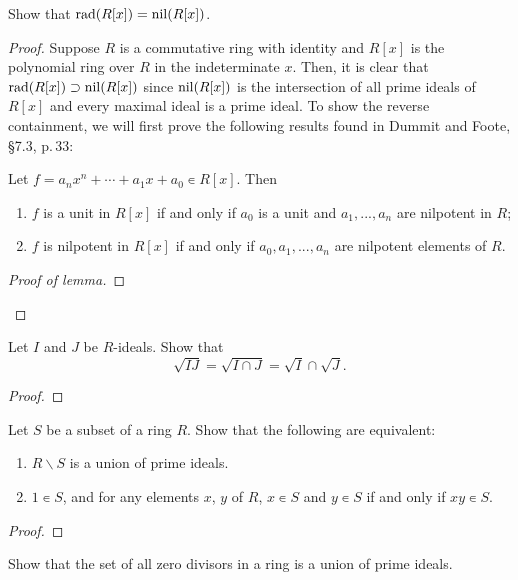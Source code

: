 \begin{problem}
Show that $\mathrm{rad}(R[x])=\mathrm{nil}(R[x])$.
\end{problem}
\begin{proof}
Suppose $R$ is a commutative ring with identity and $R[x]$ is the
polynomial ring over $R$ in the indeterminate $x$. Then, it is
clear that $\mathrm{rad}(R[x])\supset\mathrm{nil}(R[x])$ since $\mathrm{nil}(R[x])$ is
the intersection of all prime ideals of $R[x]$ and every maximal
ideal is a prime ideal. To show the reverse containment, we will
first prove the following results found in Dummit and Foote,
\S7.3, p.\,33:
\begin{lemma}
Let $f=a_nx^n+\cdots+a_1x+a_0\smallin R[x]$. Then
\begin{enumerate}[noitemsep,label=(\alph*)]
\item $f$ is a unit in $R[x]$ if and only if $a_0$ is a unit and
  $a_1,...,a_n$ are nilpotent in $R$;
\item $f$ is nilpotent in $R[x]$ if and only if $a_0,a_1,...,a_n$
  are nilpotent elements of $R$.
\end{enumerate}
\end{lemma}
\begin{proof}[Proof of lemma]
\renewcommand\qedsymbol{$\clubsuit$}
\end{proof}
\end{proof}
\newpage
\begin{problem}
Let $I$ and $J$ be $R$-ideals. Show that
\[\sqrt{IJ}=\sqrt{I\cap J}=\sqrt{I}\cap\sqrt{J}.\]
\end{problem}
\begin{proof}
\end{proof}
\newpage
\begin{problem}
Let $S$ be a subset of a ring $R$. Show that the following are
equivalent:
\begin{enumerate}[noitemsep,label=(\roman*)]
\item $R\smallsetminus S$ is a union of prime ideals.
\item $1\smallin S$, and for any elements $x$, $y$ of $R$, $x\smallin S$
  and $y\smallin S$ if and only if $xy\smallin S$.
\end{enumerate}
\end{problem}
\begin{proof}

\end{proof}
\newpage
\begin{problem}
Show that the set of all zero divisors in a ring is a union of
prime ideals.
\end{problem}
